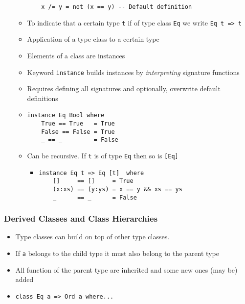 \begin{itemize}
\begin{itemize}
\begin{verbatim}
    x /= y = not (x == y) -- Default definition
\end{verbatim}
            \item To indicate that a certain type \verb+t+ if of type class \verb+Eq+ we write \verb+Eq t => t+
        \end{itemize}
        \begin{itemize}
            \item Application of a type class to a certain type
            \item Elements of a class are instances
            \item Keyword \verb+instance+ builds instances by \textit{interpreting} signature functions
            \item Requires defining all signatures and optionally, overwrite default definitions
            \item 
\begin{verbatim}
instance Eq Bool where
    True == True   = True
    False == False = True
    _ == _         = False
\end{verbatim}
            \item Can be recursive. If \verb+t+ is of type \verb+Eq+ then so is \verb+[Eq]+
                \begin{itemize}
                    \item 
\begin{verbatim}
instance Eq t => Eq [t]  where
    []     == []     = True
    (x:xs) == (y:ys) = x == y && xs == ys
    _      == _      = False
\end{verbatim}

                \end{itemize}
        \end{itemize}
\end{itemize}

\subsubsection{Derived Classes and Class Hierarchies}
\begin{itemize}
    \item Type classes can build on top of other type classes.
    \item If \verb+a+ belongs to the child type it must also belong to the parent type
    \item All function of the parent type are inherited and some new ones (may be) added
    \item
\begin{verbatim}
class Eq a => Ord a where... 
\end{verbatim}
\end{itemize}

